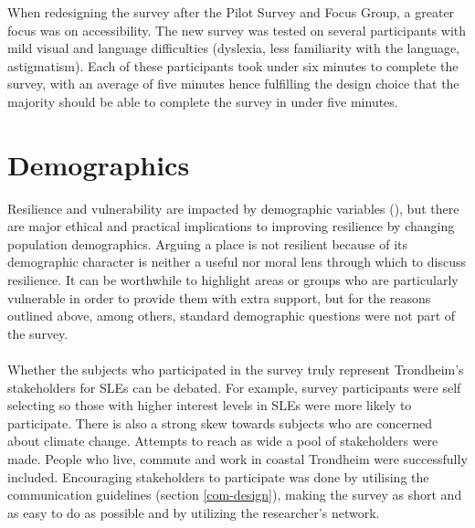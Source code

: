 When redesigning the survey after the Pilot Survey and Focus Group, a greater focus was on accessibility. The new survey was tested on several participants with mild visual and language difficulties (dyslexia, less familiarity with the language, astigmatism).  Each of these participants took under six minutes to complete the survey, with an average of five minutes hence fulfilling the design choice that the majority should be able to complete the survey in under five minutes. 
\paragraph{}



\section{Demographics}
Resilience and vulnerability are impacted by demographic variables (\cite{rod_integrated_2012}), but there are major ethical and practical implications to improving resilience by changing population demographics. Arguing a place is not resilient because of its demographic character is neither a useful nor moral lens through which to discuss resilience. It can be worthwhile to highlight areas or groups who are particularly vulnerable in order to provide them with extra support, but for the reasons outlined above, among others, standard demographic questions were not part of the survey. 


\paragraph{}
Whether the subjects who participated in the survey truly represent Trondheim's stakeholders for SLEs can be debated. For example, survey participants were self selecting so those with higher interest levels in SLEs were more likely to participate. There is also a strong skew towards subjects who are concerned about climate change. Attempts to reach as wide a pool of stakeholders were made. People who live, commute and work in coastal Trondheim were successfully included. Encouraging stakeholders to participate was done by utilising the communication guidelines (section \ref{com-design}), making the survey as short and as easy to do as possible and by utilizing the researcher's network. 



